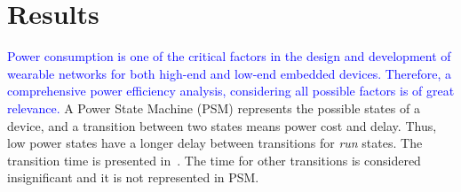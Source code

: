 \documentclass[journal]{IEEEtran}
\newcommand{\rever}{\textcolor{blue}}
\begin{document}


\vspace{-0.3cm}
\section{Results}
\label{sec:Results}
%

\rever{Power consumption is one of the critical factors in the design and development of wearable networks for both high-end and low-end embedded devices. Therefore, a comprehensive power efficiency analysis, considering all possible factors is of great relevance.} A Power State Machine (PSM) represents the possible states of a device, and a transition between two states means power cost and delay.
Thus, low power states have a longer delay between transitions for {\em run} states. The transition time is presented in~\cite{goraczko2008energy}. The time for other transitions is considered insignificant and %
it is not represented in PSM.


\end{document}
